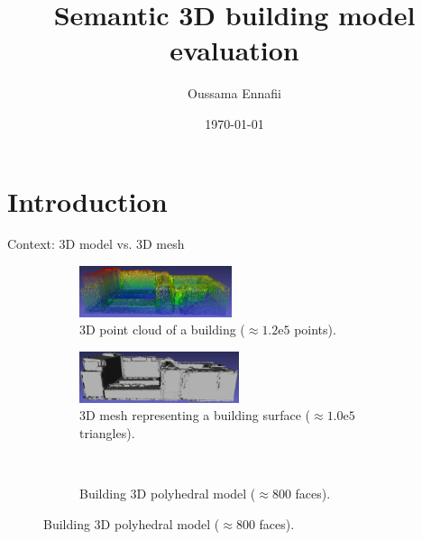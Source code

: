 \documentclass[10pt, export]{beamer}
\title{Semantic 3D building model evaluation}
\subtitle{}
\institute[LaSTIG STRUDEL]{Univ. Paris Est, LaSTIG STRUDEL, IGN, ENSG}
\date{\today}
\author[O.Ennafii]{Oussama Ennafii}
\begin{document}
    \begin{frame}[plain]
        \titlepage{}
    \end{frame}

    \section{Introduction}
        \begin{frame}{Context: 3D model vs. 3D mesh}
            \begin{figure}
                \begin{center}
                    \begin{subfigure}{.45\textwidth}
                        \begin{center}
                            \includegraphics[height=1.5cm]{images/difference_mesh_model/pc_building_bercy}
                            \caption{3D point cloud of a building ($\approx 1.2\mathrm{e}{5}$ points).}
                        \end{center}
                    \end{subfigure}
                    \begin{subfigure}{.45\textwidth}
                        \begin{center}
                            \includegraphics[height=1.5cm]{images/difference_mesh_model/bercy_building_mesh_1_e5}
                            \caption{3D mesh representing a building surface ($\approx 1.0\mathrm{e}{5}$ triangles).}
                        \end{center}
                    \end{subfigure}
                    \\
                    \begin{subfigure}{\textwidth}
                        \begin{center}
                            
                            \caption{Building 3D polyhedral model ($\approx 800$ faces).}
                        \end{center}
                    \end{subfigure}
                \end{center}
            \end{figure}
        \end{frame}
\end{document}

